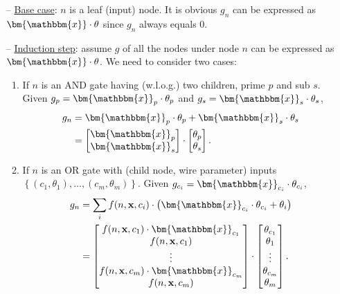 \documentclass[letterpaper]{article} %
\newcommand{\node}{n}
\newcommand{\coe}{g}
\begin{document}
\begin{itemize}
\item[--] \underline{Base case}: $\node$ is a leaf (input) node. It is obvious $\coe_n$ can be expressed as $\bm{\mathbbm{x}} \cdot {\bf \theta}$ since $\coe_n$ always equals 0.


\item[--] \underline{Induction step}: assume $\coe$ of all the nodes under node $n$ can be expressed as $\bm{\mathbbm{x}} \cdot {\bf \theta}$. We need to consider two cases:
\begin{enumerate}[wide=0pt, leftmargin=\dimexpr\labelwidth + 2\labelsep\relax]

\item If $\node$ is an AND gate having (w.l.o.g.) two children, prime $p$ and sub $s$. Given $\coe_{p} = \bm{\mathbbm{x}}_{p} \cdot \theta_{p}$ and $\coe_{s} =\bm{\mathbbm{x}}_s \cdot \theta_s$, 
\begin{align*}
\coe_\node &=  \bm{\mathbbm{x}}_{p} \cdot \theta_{p} + \bm{\mathbbm{x}}_s \cdot \theta_s \\
&= \begin{bmatrix} 
\bm{\mathbbm{x}}_p \\
\bm{\mathbbm{x}}_s
\end{bmatrix}
\cdot
\begin{bmatrix}
\theta_p \\
\theta_s
\end{bmatrix}.
\end{align*}

\item If $\node$ is an OR gate with (child node, wire parameter) inputs $\left\{(c_1,\theta_1),\dots,(c_m,\theta_m)\right\}$. Given $\coe_{c_i} =  \bm{\mathbbm{x}}_{c_i} \cdot \theta_{c_i}$,
\begin{align*} 
\coe_\node & = \sum_i  f(n,{\bf x},c_i) \cdot \left( \bm{\mathbbm{x}}_{c_i} \cdot \theta_{c_i}+ \theta_i\right) \\
&= \begin{bmatrix}
 f(n,{\bf x},c_1) \cdot\bm{\mathbbm{x}}_{c_1} \\
 f(n,{\bf x},c_1) \\
\vdots \\
 f(n,{\bf x},c_m) \cdot\bm{\mathbbm{x}}_{c_m} \\
 f(n,{\bf x},c_m) 
\end{bmatrix}
\cdot
 \begin{bmatrix}
\theta_{c_1} \\
\theta_1\\
\vdots \\
\theta_{c_m} \\
\theta_m
\end{bmatrix}.
\end{align*}
\end{enumerate}
\end{itemize}
\end{document}
